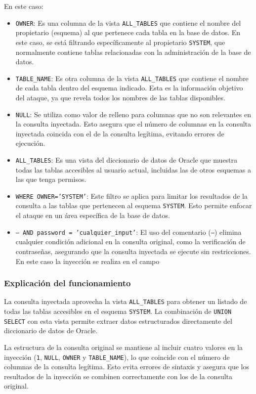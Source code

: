 \documentclass[a4paper,12pt]{article}
\begin{document}
En este caso:
\begin{itemize}
    \item \texttt{OWNER}: Es una columna de la vista \texttt{ALL\_TABLES} que contiene el nombre del propietario (esquema) al que pertenece cada tabla en la base de datos. En este caso, se está filtrando específicamente al propietario \texttt{SYSTEM}, que normalmente contiene tablas relacionadas con la administración de la base de datos.
    \item \texttt{TABLE\_NAME}: Es otra columna de la vista \texttt{ALL\_TABLES} que contiene el nombre de cada tabla dentro del esquema indicado. Esta es la información objetivo del ataque, ya que revela todos los nombres de las tablas disponibles.
    \item \texttt{NULL}: Se utiliza como valor de relleno para columnas que no son relevantes en la consulta inyectada. Esto asegura que el número de columnas en la consulta inyectada coincida con el de la consulta legítima, evitando errores de ejecución.
    \item \texttt{ALL\_TABLES}: Es una vista del diccionario de datos de Oracle que muestra todas las tablas accesibles al usuario actual, incluidas las de otros esquemas a las que tenga permisos.
    \item \texttt{WHERE OWNER='SYSTEM'}: Este filtro se aplica para limitar los resultados de la consulta a las tablas que pertenecen al esquema \texttt{SYSTEM}. Esto permite enfocar el ataque en un área específica de la base de datos.
    \item \texttt{-- AND password = 'cualquier\_input'}: El uso del comentario (\texttt{--}) elimina cualquier condición adicional en la consulta original, como la verificación de contraseñas, asegurando que la consulta inyectada se ejecute sin restricciones. En este caso la inyección se realiza en el campo \textbf{}
\end{itemize}

\subsubsection{Explicación del funcionamiento}
La consulta inyectada aprovecha la vista \texttt{ALL\_TABLES} para obtener un listado de todas las tablas accesibles en el esquema \texttt{SYSTEM}. La combinación de \texttt{UNION SELECT} con esta vista permite extraer datos estructurados directamente del diccionario de datos de Oracle.

La estructura de la consulta original se mantiene al incluir cuatro valores en la inyección (\texttt{1}, \texttt{NULL}, \texttt{OWNER} y \texttt{TABLE\_NAME}), lo que coincide con el número de columnas de la consulta legítima. Esto evita errores de sintaxis y asegura que los resultados de la inyección se combinen correctamente con los de la consulta original.
\end{document}

